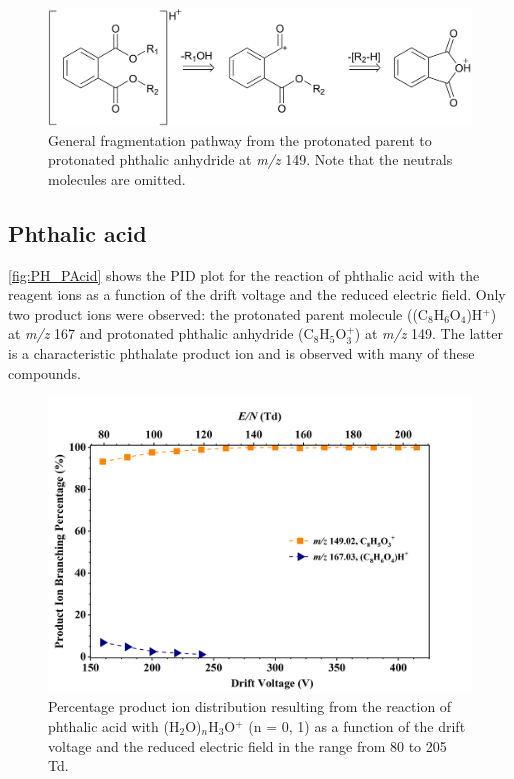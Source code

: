 \begin{figure}[htb]%
\centering
\includegraphics[height=0.12\textheight]{pics/PH/frag.png}
\caption{General fragmentation pathway from the protonated parent to  protonated phthalic anhydride at \textit{m/z} 149. Note that the neutrals molecules are omitted.}
\label{fig:PH_fr}
\end{figure}





\subsection{Phthalic acid}

\autoref{fig:PH_PAcid} shows the PID plot for the reaction of phthalic acid with the reagent ions as a function of the drift voltage and the reduced electric field. 
%
Only two product ions were observed: the protonated parent molecule  ((C$_8$H$_6$O$_4$)H$^+$)  at \textit{m/z} 167 and  protonated phthalic anhydride (C$_8$H$_{5}$O$_3^+$) at \textit{m/z} 149.
%
The latter is a characteristic phthalate product ion and is observed with many of these compounds.

    \begin{figure}[htb]
    \centering
    \includegraphics[height=0.4\textheight]{pics/Pacid-BR.png}
    \caption{Percentage product ion distribution resulting from the reaction of phthalic acid with (H$_2$O)$_n$H$_3$O$^+$ (n = 0, 1) as a function of the drift voltage and the reduced electric field in the range from 80 to 205 Td.}
    \label{fig:PH_PAcid}
    \end{figure}


